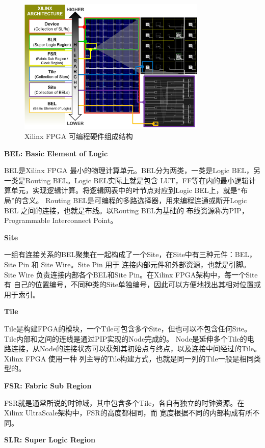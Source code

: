\begin{figure}[h]
	\centering
	\includegraphics[width=0.8\textwidth]{figure/hierarchy}
	\caption{Xilinx FPGA 可编程硬件组成结构~\cite{lavin2018rapidwright}} 
	\label{fig:hierarchy}
\end{figure}

{\bf BEL: Basic Element of Logic}

BEL是Xilinx FPGA 最小的物理计算单元。BEL分为两类，一类是Logic BEL，另一类是Routing BEL。Logic BEL实际上就是包含
LUT，FF等在内的最小逻辑计算单元，实现逻辑计算。将逻辑网表中的叶节点对应到Logic BEL上，就是“布局”的含义。
Routing BEL是可编程的多路选择器，用来编程连通或断开Logic BEL 之间的连接，也就是布线。以Routing BEL为基础的
布线资源称为PIP，Programmable Interconnect Point。

{\bf Site}

一组有连接关系的BEL聚集在一起构成了一个Site，在Site中有三种元件：BEL，Site Pin 和 Site Wire。Site Pin 用于
连接内部元件和外部资源，也就是引脚。Site Wire 负责连接内部各个BEL和Site Pin。在Xilinx FPGA架构中，每一个Site有
自己的位置编号，不同种类的Site单独编号，因此可以方便地找出其相对位置或用于索引。

{\bf Tile}

Tile是构建FPGA的模块，一个Tile可包含多个Site，但也可以不包含任何Site。Tile内部和之间的连线是通过PIP实现的Node完成的。
Node是延伸多个Tile的电路连接，从Node的连接状态可以获知其初始点与终点，以及连接中间经过的Tile。Xilinx FPGA 使用一种
列主导的Tile构建方式，也就是同一列的Tile一般是相同类型的。

{\bf FSR: Fabric Sub Region}

FSR就是通常所说的时钟域，其中包含多个Tile，各自有独立的时钟资源。在Xilinx UltraScale架构中，FSR的高度都相同，而
宽度根据不同的内部构成有所不同。


{\bf SLR: Super Logic Region}

